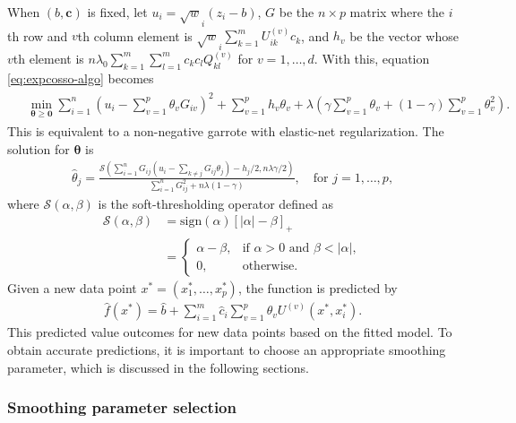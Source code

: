 When \((b, \pmb{c})\) is fixed, let \(u_i=\sqrt{w}_i(z_i-b)\), \(G\) be the \(n \times p\) matrix where the \(i\)th row and \(v\)th column element is \(\sqrt{w}_i \sum_{k=1}^{m}U_{ik}^{(v)}c_k\), and \(h_v\) be the vector whose \(v\)th element is \(n\lambda_0 \sum_{k=1}^{m}\sum_{l=1}^{m}c_k c_l Q_{kl}^{(v)}\) for \(v = 1, \dots, d\). With this, equation \eqref{eq:expcosso-algo} becomes
\begin{align}
    \begin{split}
        &\min_{\pmb{\theta} \geq \pmb{0}} 
        \sum_{i=1}^{n} \left( u_i - \sum_{v=1}^{p} \theta_v G_{iv} \right)^2
        + \sum_{v=1}^{p} h_v \theta_v 
        + \lambda \left(\gamma \sum_{v=1}^{p} \theta_v + (1-\gamma) \sum_{v=1}^{p} \theta_v^2 \right).
    \end{split}
    \label{eq:expcosso-thetastep-algo} 
\end{align}
This is equivalent to a non-negative garrote with elastic-net regularization. The solution for \(\pmb{\theta}\) is
\begin{align}
    \hat{\theta}_j 
    = \frac{\mathcal{S}\left(\sum_{i=1}^{n} G_{ij}(u_{i}-\sum_{k \neq j} G_{ij} \theta_{j}) - h_{j}/2, n\lambda \gamma/2 \right)}
           {\sum_{i=1}^{n} G_{ij}^2 + n\lambda (1-\gamma)}, \quad \text{for } j = 1, \dots, p,
  \label{eq:expcosso-thetastep-sol} 
\end{align}
where \(\mathcal{S}(\alpha, \beta)\) is the soft-thresholding operator defined as
\begin{align*}
    \mathcal{S}(\alpha, \beta) 
    &= \text{sign}(\alpha)\left[|\alpha| - \beta\right]_+ \\
    &= \begin{cases}
        \alpha - \beta, & \text{if } \alpha > 0 \text{ and } \beta < |\alpha|, \\
        0, & \text{otherwise.}
    \end{cases} 
\end{align*}
Given a new data point \(x^* = (x_1^*, \dots, x_p^*)\), the function is predicted by
\begin{align*}
    \hat{f}(x^*) = \hat{b} + \sum_{i=1}^{m} \hat{c}_i \sum_{v=1}^{p} \hat{\theta}_v U^{(v)}(x^*, x_i^*).
\end{align*}
This predicted value outcomes for new data points based on the fitted model. To obtain accurate predictions, it is important to choose an appropriate smoothing parameter, which is discussed in the following sections.

\hypertarget{smoothing-parameter-selection}{%
\subsubsection{Smoothing parameter selection}\label{smoothing-parameter-selection}}

